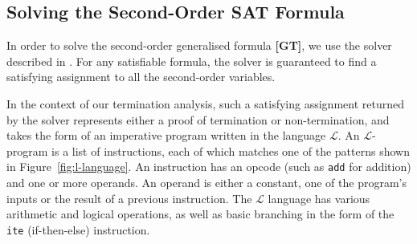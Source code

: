 \documentclass[a4paper]{llncs}
\begin{document}


\subsection{Solving the Second-Order SAT Formula}
In order to solve the second-order generalised formula {\bf [GT]}, we use the solver described in \cite{kalashnikov}.
%
%
%
For any satisfiable formula, the solver is guaranteed to find a satisfying assignment to
all the second-order variables. 

In the context of our termination analysis, such a satisfying assignment returned by the solver 
represents either a proof of termination or non-termination, and
takes the form of an imperative program
written in the language $\mathcal{L}$.  An $\mathcal{L}$-program is a list
of instructions, each of which matches one of the patterns shown in
Figure~\ref{fig:l-language}.  An instruction has an opcode (such as
\verb|add| for addition) and one or more operands.  An operand is either a
constant, one of the program's inputs or the result of a previous
instruction.  The $\mathcal{L}$ language has various arithmetic and logical
operations, as well as basic branching in the form of the \verb|ite|
(if-then-else) instruction.
\end{document}
